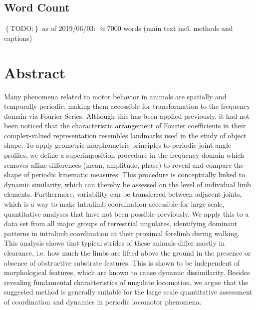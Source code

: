 \documentclass[10pt, a4paper]{article}
\newcommand{\todo}[1]{\colorbox{terracotta!30!yellow}{\footnotesize{$\left\lbrace\text{TODO:}\right\rbrace$ }#1\normalsize}}
\begin{document}
\subsection{Word Count}
\todo{as of 2019/06/03}: $\approx 7000$ words (main text incl. methods and captions)


\pagebreak
\section{Abstract}
Many phenomena related to motor behavior in animals are spatially and temporally periodic, making them accessible for transformation to the frequency domain via Fourier Series.
Although this has been applied previously, it had not been noticed that the characteristic arrangement of Fourier coefficients in their complex-valued representation resembles landmarks used in the study of object shape. 
To apply geometric morphometric principles to periodic joint angle profiles, we define a superimposition procedure in the frequency domain which removes affine differences (mean, amplitude, phase) to reveal and compare the shape of periodic kinematic measures. 
This procedure is conceptually linked to dynamic similarity, which can thereby be assessed on the level of individual limb elements. 
Furthermore, variability can be transferred between adjacent joints, which is a way to make intralimb coordination accessible for large scale, quantitative analyses that have not been possible previously. 
We apply this to a data set from all major groups of terrestrial ungulates, identifying dominant patterns in intralimb coordination at their proximal forelimb during walking. 
This analysis shows that typical strides of these animals differ mostly in clearance, i.e. how much the limbs are lifted above the ground in the presence or absence of obstructive substrate features. 
This is shown to be independent of morphological features, which are known to cause dynamic dissimilarity. 
Besides revealing fundamental characteristics of ungulate locomotion, we argue that the suggested method is generally suitable for the large scale quantitative assessment of coordination and dynamics in periodic locomotor phenomena. 

\pagebreak
\end{document}

